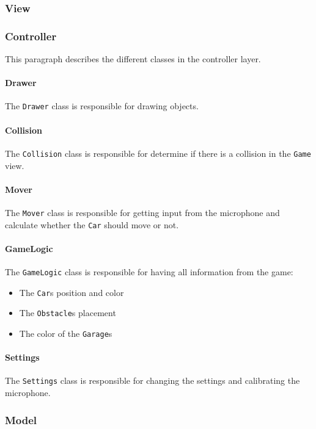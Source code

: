 \subsubsection{View}

\subsubsection{Controller}
This paragraph describes the different classes in the controller layer.
\paragraph{Drawer}
The \lstinline!Drawer! class is responsible for drawing objects.
\paragraph{Collision}
The \lstinline!Collision! class is responsible for determine if there is a collision in the \lstinline!Game! view.
\paragraph{Mover}
The \lstinline!Mover! class is responsible for getting input from the microphone and calculate whether the \lstinline!Car! should move or not.
\paragraph{GameLogic}
The \lstinline!GameLogic! class is responsible for having all information from the game:
\begin{itemize}
\item The \lstinline!Car!s position and color
\item The \lstinline!Obstacle!s placement
\item The color of the \lstinline!Garage!s
\end{itemize}
\paragraph{Settings}
The \lstinline!Settings! class is responsible for changing the settings and calibrating the microphone.
\subsubsection{Model}